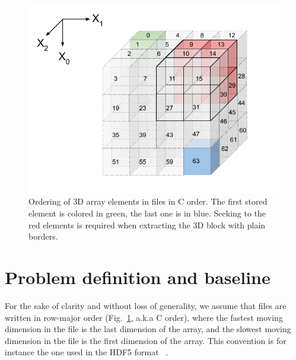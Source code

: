 \documentclass[sigconf, nonacm]{acmart}
\begin{document}

\begin{figure}
  \centering
  \includegraphics[scale=0.32]{./figures/figure_1.png}
  \caption{Ordering of 3D array elements in files in C order. The first stored element is colored in green,
  the last one is in blue. Seeking to the red elements is required when extracting the 3D block with plain borders.}
  \label{fig:seeks_and_rowmajor}
\end{figure}

\section{Problem definition and baseline}


For the sake of clarity and without loss of generality, we assume that
 files are written in row-major order (Fig.~\ref{fig:seeks_and_rowmajor},
 a.k.a C order), where the fastest moving dimension in the file is the
 last dimension of the array, and the slowest moving dimension in the file
 is the first dimension of the array. This convention is for instance the
 one used in the HDF5 format ~\cite{hdf5}.
\end{document}
